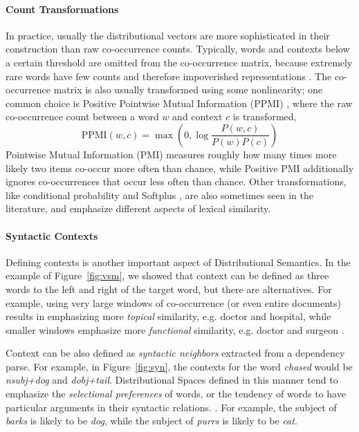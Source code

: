\paragraph{Count Transformations}
In practice, usually the distributional vectors are more sophisticated in their
construction than raw co-occurrence counts.  Typically, words and contexts
below a certain threshold are omitted from the co-occurrence matrix, because
extremely rare words have few counts and therefore impoverished representations
\cite{turney:2010:jair}. The co-occurrence matrix is also usually transformed
using some nonlinearity; one common choice is Positive Pointwise Mutual
Information (PPMI) \cite{bullinaria:2007:brm}, where the raw co-occurrence count
between a word $w$ and context $c$ is transformed,
\begin{equation*}
  \text{PPMI}(w, c) = \max\left(0, \log\frac{P(w, c)}{P(w)P(c)}\right)
\end{equation*}
Pointwise Mutual Information (PMI) measures roughly how many times more likely two
items co-occur more often than chance, while Positive PMI
additionally ignores co-occurrences that occur less often than chance.  Other
transformations, like conditional probability
\cite{hofman:1999:sigir,blei:2003:jmlr} and Softplus
\cite{pennington:2014:emnlp}, are also sometimes seen in the literature, and
emphasize different aspects of lexical similarity.

\paragraph{Syntactic Contexts}
Defining contexts is another important aspect of Distributional Semantics.
In the example of Figure~\ref{fig:vsm}, we showed that context can be defined
as three words to the left and right of the target word, but there are
alternatives. For example, using very large windows of co-occurrence (or even
entire documents) results in emphasizing more {\em topical} similarity, e.g. doctor
and hospital, while smaller windows emphasize more {\em functional} similarity, e.g.
doctor and surgeon \cite{pado:2007:cl,erk:2008:emnlp,levy:2014:acl}.

Context can be also defined as {\em syntactic neighbors} extracted from a
dependency parse. For example, in Figure~\ref{fig:syn}, the
contexts for the word {\em chased} would be {\em nsubj+dog} and {\em
dobj+tail}. Distributional Spaces defined in this manner tend to emphasize the
{\em selectional preferences} of words, or the tendency of words to have
particular arguments in their syntactic relations.
\cite{pado:2007:cl,erk:2008:emnlp,baroni:2010:cl,levy:2014:acl}. For example,
the subject of {\em barks} is likely to be {\em dog}, while the subject of
{\em purrs} is likely to be {\em cat}.

